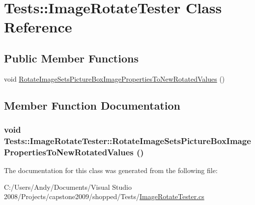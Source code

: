 \hypertarget{class_tests_1_1_image_rotate_tester}{
\section{Tests::ImageRotateTester Class Reference}
\label{class_tests_1_1_image_rotate_tester}
}
\subsection*{Public Member Functions}
\begin{DoxyCompactItemize}
\item 
void \hyperlink{class_tests_1_1_image_rotate_tester_a57ad1def77297f660af2028aeef982c9}{RotateImageSetsPictureBoxImagePropertiesToNewRotatedValues} ()
\end{DoxyCompactItemize}


\subsection{Member Function Documentation}
\hypertarget{class_tests_1_1_image_rotate_tester_a57ad1def77297f660af2028aeef982c9}{
\subsubsection[{RotateImageSetsPictureBoxImagePropertiesToNewRotatedValues}]{\setlength{\rightskip}{0pt plus 5cm}void Tests::ImageRotateTester::RotateImageSetsPictureBoxImagePropertiesToNewRotatedValues ()}}
\label{class_tests_1_1_image_rotate_tester_a57ad1def77297f660af2028aeef982c9}


The documentation for this class was generated from the following file:\begin{DoxyCompactItemize}
\item 
C:/Users/Andy/Documents/Visual Studio 2008/Projects/capstone2009/shopped/Tests/\hyperlink{_image_rotate_tester_8cs}{ImageRotateTester.cs}\end{DoxyCompactItemize}
